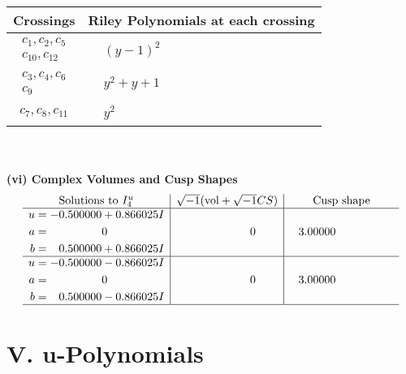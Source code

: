 \documentclass[1p]{elsarticle_modified}
\theoremstyle{definition}
\newcommand{\I}{\sqrt{-1}}
\begin{document}
\begin{tabular}{m{50pt}|m{274pt}}
Crossings & \hspace{64pt}Riley Polynomials at each crossing \\
\hline $$\begin{aligned}c_{1},c_{2},c_{5}\\c_{10},c_{12}\end{aligned}$$&$\begin{aligned}
&(y-1)^2
\end{aligned}$\\
\hline $$\begin{aligned}c_{3},c_{4},c_{6}\\c_{9}\end{aligned}$$&$\begin{aligned}
&y^2+y+1
\end{aligned}$\\
\hline $$\begin{aligned}c_{7},c_{8},c_{11}\end{aligned}$$&$\begin{aligned}
&y^2
\end{aligned}$\\
\hline
\end{tabular}\\~\\
\newpage\flushleft \textbf{(vi) Complex Volumes and Cusp Shapes}
$$\begin{array}{c|c|c}  
\text{Solutions to }I^u_{4}& \I (\text{vol} + \sqrt{-1}CS) & \text{Cusp shape}\\
 \hline 
\begin{aligned}
u &= -0.500000 + 0.866025 I \\
a &= \phantom{-0.000000 } 0 \\
b &= \phantom{-}0.500000 + 0.866025 I\end{aligned}
 & \phantom{-0.000000 } 0 & \phantom{-}3.00000\phantom{ +0.000000I} \\ \hline\begin{aligned}
u &= -0.500000 - 0.866025 I \\
a &= \phantom{-0.000000 } 0 \\
b &= \phantom{-}0.500000 - 0.866025 I\end{aligned}
 & \phantom{-0.000000 } 0 & \phantom{-}3.00000\phantom{ +0.000000I}\\
 \hline 
 \end{array}$$\newpage
\newpage\renewcommand{\arraystretch}{1}
\centering \section*{ V. u-Polynomials}
\end{document}

